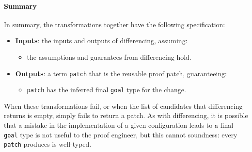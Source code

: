 \paragraph{Summary}
In summary, the transformations together have the following specification:

\begin{itemize}
\item \textbf{Inputs}: the inputs and outputs of differencing, assuming:
\begin{itemize}
\item the assumptions and guarantees from differencing hold.
\end{itemize}
\item \textbf{Outputs}: a term \lstinline{patch} that is the reusable proof patch, guaranteeing:
\begin{itemize}
\item \lstinline{patch} has the inferred final \lstinline{goal} type for the change.
\end{itemize}
\end{itemize}
When these transformations fail, or when the list of candidates that differencing returns is empty,
\sysname simply fails to return a patch.
As with differencing, it is possible that a mistake in the implementation of a given configuration
leads to a final \lstinline{goal} type is not useful to the proof engineer,
but this cannot soundness:
every \lstinline{patch} \toolname produces is well-typed.

